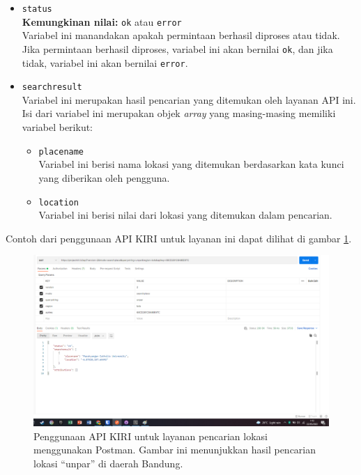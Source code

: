 \documentclass[a4paper,twoside]{article}
\begin{document}
\begin{enumerate}
\begin{itemize}
	\item \verb|status|\\
	\textbf{Kemungkinan nilai:} \verb|ok| atau \verb|error|\\
	Variabel ini manandakan apakah permintaan berhasil diproses atau tidak. Jika permintaan berhasil diproses, variabel ini akan bernilai \verb|ok|, dan jika tidak, variabel ini akan bernilai \verb|error|.
	\item \verb|searchresult|\\
	Variabel ini merupakan hasil pencarian yang ditemukan oleh layanan API ini. Isi dari variabel ini merupakan objek \textit{array} yang masing-masing memiliki variabel berikut:
	
	\begin{itemize}
		\item \verb|placename|\\
		Variabel ini berisi nama lokasi yang ditemukan berdasarkan kata kunci yang diberikan oleh pengguna.
		\item \verb|location|\\
		Variabel ini berisi nilai \latlon dari lokasi yang ditemukan dalam pencarian.
	\end{itemize}
	
\end{itemize}
\vspace{\baselineskip}\noindent
Contoh dari penggunaan API KIRI untuk layanan ini dapat dilihat di gambar \ref{fig:kiri-api-searchplace-usage}.

\begin{figure}[t]
    \centering
    \includegraphics[width=0.74\linewidth]{apikiri-searchplace}
    \caption[Penggunaan API KIRI untuk layanan pencarian lokasi]{Penggunaan API KIRI untuk layanan pencarian lokasi menggunakan Postman. Gambar ini menunjukkan hasil pencarian lokasi ``unpar'' di daerah Bandung.}
    \label{fig:kiri-api-searchplace-usage}
\end{figure}


\end{enumerate}
\end{document}
